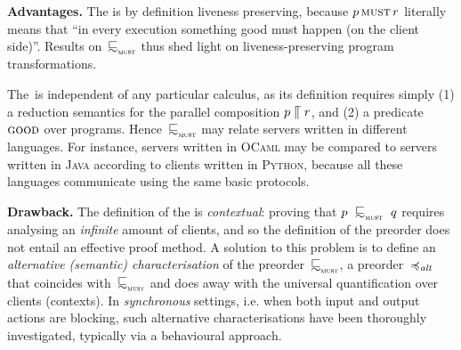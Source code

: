   {\bfseries Advantages.}
  The \mustpreorder is by definition liveness preserving,
  because $ p  \operatorname{\textsc{must}}  r $ literally means that
  ``in every execution something good must happen (on the client
  side)''.  Results on~$\testleqS$ thus shed light on
  liveness-preserving program transformations.

  The~\mustpreorder is independent of any particular calculus,
  as its definition requires simply
  (1) a reduction semantics for the parallel composition
  $p  \mathrel{\llceil}  r$, and (2)
  a predicate $\textsc{good}$ over programs.
  Hence~$\testleqS$
  may relate servers written in different languages. For instance, servers written in
  \textsc{OCaml} may be compared to servers written in \textsc{Java}
  according to clients written in \textsc{Python}, because all these
  languages communicate using the same basic protocols.

  {\bfseries Drawback.}
  The definition of the \mustpreorder is {\em contextual}: proving that
  $\serverA~\testleqS~\serverB$ requires analysing an {\em
  infinite} amount of clients, and so the definition of
the preorder does not entail an effective proof method.
A solution to this problem is to define an {\em alternative (semantic)
  characterisation} of the preorder~$\testleqS$, \ie a
preorder~$\preccurlyeq_{\mathit{alt}}$ that coincides with~$\testleqS$
and does away with the universal quantification over clients (\ie contexts).
In {\em synchronous} settings, i.e. when both input and output
actions are blocking, such alternative characterisations have been thoroughly
investigated, %
typically via a behavioural approach.






